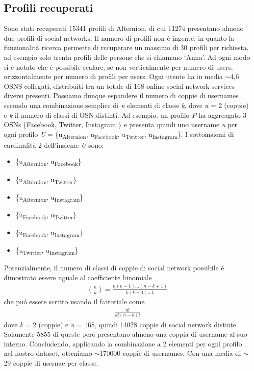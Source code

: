 \subsection{Profili recuperati}
Sono stati recuperati 15341 profili di Alternion, di cui 11274 presentano almeno due profili di social networks. Il numero di profili non è ingente, in quanto la funzionalità ricerca permette di recuperare un massimo di 30 profili per richiesta, ad esempio solo trenta profili delle persone che si chiamano `Anna'. Ad ogni modo si è notato che è possibile scalare, se non verticalmente per numero di users, orizzontalmente per numero di profili per users. Ogni utente ha in media $\sim$4,6 OSNS collegati, distribuiti tra un totale di 168 online social network services diversi presenti. Possiamo dunque espandere il numero di coppie di usernames secondo una combinazione semplice di \textit{n} elementi di classe \textit{k}, dove \textit{n} = 2 (coppie) e \textit{k} il numero di classi di OSN distinti. Ad esempio, un profilo \textit{P} ha aggreagato 3 OSNs \{Facebook, Twitter, Instagram \} e presenta quindi uno username \textit{u} per ogni profilo
\textit{U} = \{u\textsubscript{Alternion}, u\textsubscript{Facebook}, u\textsubscript{Twitter}, u\textsubscript{Instagram}\}. I sottoinsiemi di cardinalità 2 dell'insieme \textit{U} sono:
\begin{itemize}
  \item \{u\textsubscript{Alternion}, u\textsubscript{Facebook}\}
  \item \{u\textsubscript{Alternion}, u\textsubscript{Twitter}\}
  \item \{u\textsubscript{Alternion}, u\textsubscript{Instagram}\}
  \item \{u\textsubscript{Facebook}, u\textsubscript{Twitter}\}
  \item \{u\textsubscript{Facebook}, u\textsubscript{Instagram}\}
  \item \{u\textsubscript{Twitter}, u\textsubscript{Instagram}\}
\end{itemize}
Potenzialmente, il numero di classi di coppie di social network possibile é dimostrato essere uguale al coefficiente binomiale
\begin{gather*}
  \binom nk = \frac{n(n-1)\ldots(n-k+1)}{k(k-1)\dots1}
\end{gather*}
che puó essere scritto usando il fattoriale come
\begin{gather*}
  \frac{n!}{k!(n-k)!}
\end{gather*}
dove \textit{k} = 2 (coppie) e \textit{n} = 168, quindi 14028 coppie di social network distinte. Solamente 5855 di queste peró presentano almeno una coppia di username al suo interno. Concludendo, applicando la combinazione a 2 elementi per ogni profilo nel nostro dataset, otteniamo $\sim$170000 coppie di usernames. Con una media di $\sim$29 coppie di usernae per classe.

